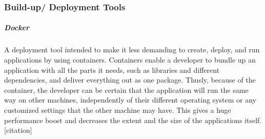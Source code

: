 \subsubsection{Build-up/ Deployment Tools}
\subparagraph{Docker}
A deployment tool intended to make it less demanding to create, deploy, and run applications by using containers. Containers enable a developer to bundle up an application with all the parts it needs, such as libraries and different dependencies, and deliver everything out as one package. Thusly, because of the container, the developer can be certain that the application will run the same way on other machines, independently of their different operating system or any customized settings that the other machine may have. This gives a huge performance boost and decreases the extent and the size of the applications itself. [citation]
